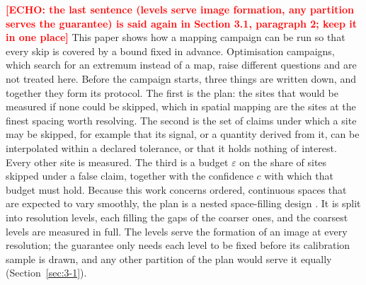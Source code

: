 \documentclass{iopjournal}
\newcommand{\ask}[1]{\textcolor{red}{\textbf{[#1]}}}
\begin{document}
\ask{ECHO: the last sentence (levels serve image formation, any partition serves the guarantee) is said again in Section 3.1, paragraph 2; keep it in one place} This paper shows how a mapping campaign can be run so that every skip is covered by a bound fixed in advance. Optimisation campaigns, which search for an extremum instead of a map, raise different questions and are not treated here. Before the campaign starts, three things are written down, and together they form its protocol. The first is the plan: the sites that would be measured if none could be skipped, which in spatial mapping are the sites at the finest spacing worth resolving. The second is the set of claims under which a site may be skipped, for example that its signal, or a quantity derived from it, can be interpolated within a declared tolerance, or that it holds nothing of interest. Every other site is measured. The third is a budget \ensuremath{\varepsilon} on the share of sites skipped under a false claim, together with the confidence $c$ with which that budget must hold. Because this work concerns ordered, continuous spaces that are expected to vary smoothly, the plan is a nested space-filling design \cite{Qian2009}. It is split into resolution levels, each filling the gaps of the coarser ones, and the coarsest levels are measured in full. The levels serve the formation of an image at every resolution; the guarantee only needs each level to be fixed before its calibration sample is drawn, and any other partition of the plan would serve it equally (Section~\ref{sec:3-1}).
\end{document}

